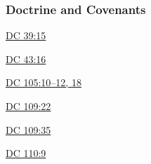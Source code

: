 	\subsubsection{Doctrine and Covenants} %
		\label{ENDOWMENT-DC}
	
		
		\begin{compactdesc}
			\item[{\hyperref[DC39-15]{DC 39:15}}]
			\item[{\hyperref[DC43-16]{DC 43:16}}]
			\item[{\hyperref[DC105-10]{DC 105:10--12, 18}}]
			\item[{\hyperref[DC109-22]{DC 109:22}}]
			\item[{\hyperref[DC109-35]{DC 109:35}}]
			\item[{\hyperref[DC110-9]{DC 110:9}}]
		\end{compactdesc}
		
	
		
		

	
